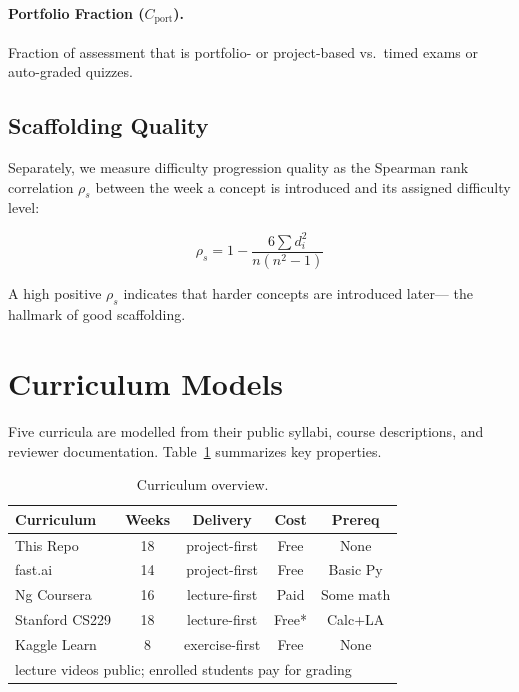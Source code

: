 \documentclass[10pt,twocolumn]{article}
\begin{document}
\paragraph{Portfolio Fraction ($C_{\text{port}}$).}
Fraction of assessment that is portfolio- or project-based 
vs.\ timed exams or auto-graded quizzes.

\subsection{Scaffolding Quality}

Separately, we measure difficulty progression quality as the Spearman rank 
correlation $\rho_s$ between the week a concept is introduced and its 
assigned difficulty level:

\begin{equation}
\rho_s = 1 - \frac{6 \sum d_i^2}{n(n^2 - 1)}
\label{eq:spearman}
\end{equation}

A high positive $\rho_s$ indicates that harder concepts are introduced later—
the hallmark of good scaffolding.

\section{Curriculum Models}

Five curricula are modelled from their public syllabi, course descriptions, 
and reviewer documentation. Table~\ref{tab:curricula} summarizes key properties.

\begin{table}[h]
\centering
\caption{Curriculum overview.}
\label{tab:curricula}
\small
\begin{tabular}{lcccc}
\toprule
\textbf{Curriculum} & \textbf{Weeks} & \textbf{Delivery} & \textbf{Cost} & \textbf{Prereq} \\
\midrule
This Repo    & 18 & project-first   & Free  & None      \\
fast.ai      & 14 & project-first   & Free  & Basic Py  \\
Ng Coursera  & 16 & lecture-first   & Paid  & Some math \\
Stanford CS229 & 18 & lecture-first & Free* & Calc+LA   \\
Kaggle Learn & 8  & exercise-first  & Free  & None      \\
\bottomrule
\multicolumn{5}{l}{\small *lecture videos public; enrolled students pay for grading}
\end{tabular}
\end{table}
\end{document}
